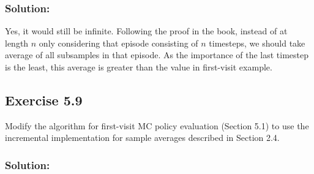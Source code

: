 \subsubsection*{Solution:}

Yes, it would still be infinite. Following the proof in the book, instead of at length $n$ only considering that episode consisting of $n$ timesteps, we should take average of all subsamples in that episode. As the importance of the last timestep is the least, this average is greater than the value in first-visit example.


\subsection*{Exercise 5.9}
Modify the algorithm for first-visit MC policy evaluation (Section 5.1) to
use the incremental implementation for sample averages described in Section 2.4.

\subsubsection*{Solution:}


